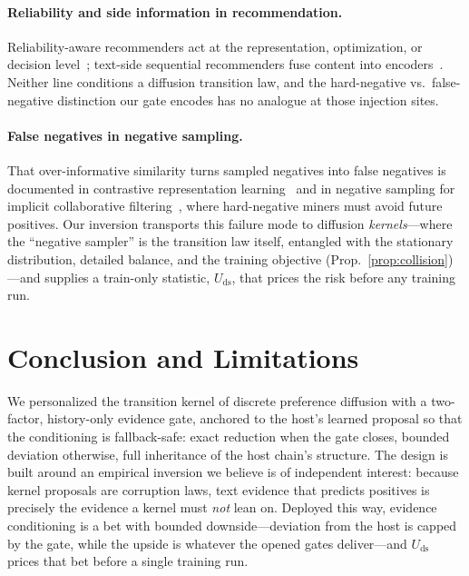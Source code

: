\documentclass[letterpaper]{article}
\newcommand{\Uds}{U_{\mathrm{ds}}}
\begin{document}
\paragraph{Reliability and side information in recommendation.}
Reliability-aware recommenders act at the representation, optimization,
or decision level~\cite{ugr,truthsr}; text-side sequential recommenders
fuse content into encoders~\cite{recformer,unisrec}. Neither line
conditions a diffusion transition law, and the hard-negative vs.\
false-negative distinction our gate encodes has no analogue at those
injection sites.

\paragraph{False negatives in negative sampling.}
That over-informative similarity turns sampled negatives into false
negatives is documented in contrastive representation
learning~\cite{debiased} and in negative sampling for implicit
collaborative filtering~\cite{srns}, where hard-negative miners must
avoid future positives. Our inversion transports this failure mode to
diffusion \emph{kernels}---where the ``negative sampler'' is the
transition law itself, entangled with the stationary distribution,
detailed balance, and the training objective
(Prop.~\ref{prop:collision})---and supplies a train-only statistic,
$\Uds$, that prices the risk before any training run.

\section{Conclusion and Limitations}
\label{sec:conclusion}

We personalized the transition kernel of discrete preference diffusion
with a two-factor, history-only evidence gate, anchored to the host's
learned proposal so that the conditioning is fallback-safe: exact
reduction when the gate closes, bounded deviation otherwise, full
inheritance of the host chain's structure. The design is built around
an empirical inversion we believe is of independent interest: because
kernel proposals are corruption laws, text evidence that predicts
positives is precisely the evidence a kernel must \emph{not} lean on.
Deployed this way, evidence conditioning is a bet with bounded
downside---deviation from the host is capped by the gate, while the
upside is whatever the opened gates deliver---and $\Uds$ prices that
bet before a single training run.
\end{document}
